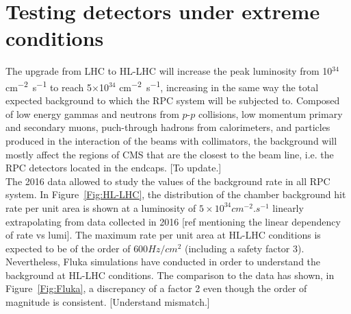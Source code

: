 \section{Testing detectors under extreme conditions}
\label{chapt5:sec:extreme}
	
	The upgrade from LHC to HL-LHC will increase the peak luminosity from 10$^{34}$ \si{cm^{-2}.s^{-1}} to reach 5$\times$10$^{34}$ \si{cm^{-2}.s^{-1}}, increasing in the same way the total expected background to which the RPC system will be subjected to.
	Composed of low energy gammas and neutrons from $p$-$p$ collisions, low momentum primary and secondary muons, puch-through hadrons from calorimeters, and particles produced in the interaction of the beams with collimators, the background will mostly affect the regions of CMS that are the closest to the beam line, i.e. the RPC detectors located in the endcaps. {\color{blue} [To update.]}\\
	
    The 2016 data allowed to study the values of the background rate in all RPC system.
	In Figure~\ref{Fig:HL-LHC}, the distribution of the chamber background hit rate per unit area is shown at a luminosity of $5\times10^{34}cm^{-2}.s^{-1}$ linearly extrapolating from data collected in 2016 {\color{blue} [ref mentioning the linear dependency of rate vs lumi]}.
	The maximum rate per unit area at HL-LHC conditions is expected to be of the order of ${600}{Hz/cm^2}$ (including a safety factor 3).
	Nevertheless, Fluka simulations have conducted in order to understand the background at HL-LHC conditions.
	The comparison to the data has shown, in Figure~\ref{Fig:Fluka}, a discrepancy of a factor 2 even though the order of magnitude is consistent. {\color{blue} [Understand mismatch.]}\\
    
